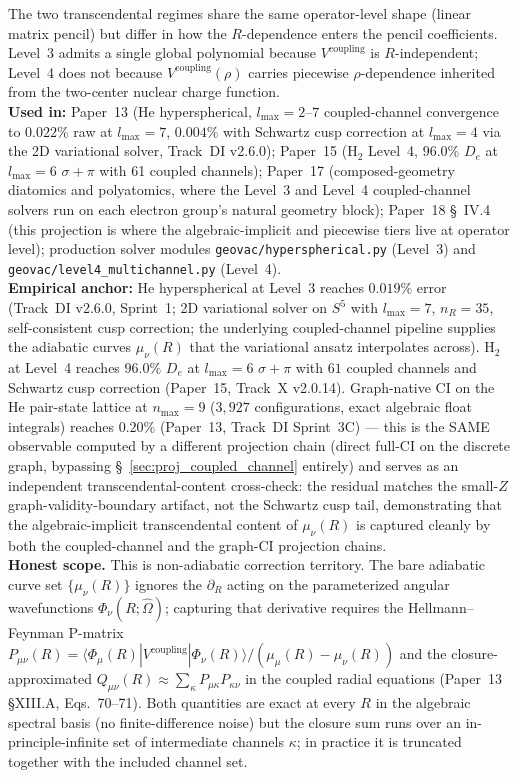 \documentclass[11pt]{article}
\begin{document}
The two transcendental regimes share the same operator-level shape
(linear matrix pencil) but differ in how the $R$-dependence enters
the pencil coefficients.  Level~3 admits a single global polynomial
because $V^\text{coupling}$ is $R$-independent; Level~4 does not
because $V^\text{coupling}(\rho)$ carries piecewise $\rho$-dependence
inherited from the two-center nuclear charge function.\\
\textbf{Used in:} Paper~13 (He hyperspherical, $l_\text{max}=2$--$7$
coupled-channel convergence to $0.022\%$ raw at $l_\text{max}=7$,
$0.004\%$ with Schwartz cusp correction at $l_\text{max}=4$ via the 2D
variational solver, Track~DI v2.6.0); Paper~15 (H$_2$ Level~4,
$96.0\%$ $D_e$ at $l_\text{max}=6$ $\sigma+\pi$ with 61 coupled
channels); Paper~17 (composed-geometry diatomics and polyatomics,
where the Level~3 and Level~4 coupled-channel solvers run on each
electron group's natural geometry block); Paper~18 \S~IV.4 (this
projection is where the algebraic-implicit and piecewise tiers live
at operator level); production solver modules
\texttt{geovac/hyperspherical.py} (Level~3) and
\texttt{geovac/level4\_multichannel.py} (Level~4).\\
\textbf{Empirical anchor:} He hyperspherical at Level~3 reaches
$0.019\%$ error (Track~DI v2.6.0, Sprint~1; 2D variational solver on
$S^5$ with $l_\text{max}=7$, $n_R=35$, self-consistent cusp
correction; the underlying coupled-channel pipeline supplies the
adiabatic curves $\mu_\nu(R)$ that the variational ansatz interpolates
across).  H$_2$ at Level~4 reaches $96.0\%$ $D_e$ at $l_\text{max}=6$
$\sigma+\pi$ with $61$ coupled channels and Schwartz cusp correction
(Paper~15, Track~X v2.0.14).  Graph-native CI on the He pair-state
lattice at $n_\text{max}=9$ ($3{,}927$ configurations, exact algebraic
float integrals) reaches $0.20\%$ (Paper~13, Track~DI Sprint~3C) ---
this is the SAME observable computed by a different projection chain
(direct full-CI on the discrete graph, bypassing
\S~\ref{sec:proj_coupled_channel} entirely) and serves as an
independent transcendental-content cross-check: the residual matches
the small-$Z$ graph-validity-boundary artifact, not the Schwartz
cusp tail, demonstrating that the algebraic-implicit transcendental
content of $\mu_\nu(R)$ is captured cleanly by both the coupled-channel
and the graph-CI projection chains.\\
\textbf{Honest scope.}  This is non-adiabatic correction territory.
The bare adiabatic curve set $\{\mu_\nu(R)\}$ ignores the
$\partial_R$ acting on the parameterized angular wavefunctions
$\Phi_\nu(R; \hat{\Omega})$; capturing that derivative requires the
Hellmann--Feynman P-matrix $P_{\mu\nu}(R) = \langle \Phi_\mu(R) |
V^\text{coupling} | \Phi_\nu(R) \rangle / (\mu_\mu(R) - \mu_\nu(R))$
and the closure-approximated $Q_{\mu\nu}(R) \approx \sum_\kappa
P_{\mu\kappa} P_{\kappa\nu}$ in the coupled radial equations (Paper~13
§XIII.A, Eqs.~70--71).  Both quantities are exact at every $R$ in the
algebraic spectral basis (no finite-difference noise) but the closure
sum runs over an in-principle-infinite set of intermediate channels
$\kappa$; in practice it is truncated together with the included
channel set.
\end{document}
